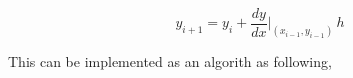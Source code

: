 \documentclass[journal]{IEEEtran}
\begin{document}
\begin{enumerate}
    $$
        y_{i+1} = y_i + \frac{dy}{dx}|_{(x_{i-1}, y_{i-1})} \, h
    $$

    This can be implemented as an algorith as following,
        
        



\end{enumerate}
\end{document}
